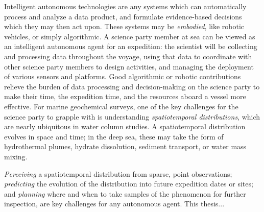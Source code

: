 Intelligent autonomous technologies are any systems which can automatically process and analyze a data product, and formulate evidence-based decisions which they may then act upon.
These systems may be \emph{embodied}, like robotic vehicles, or simply algorithmic.
A science party member at sea can be viewed as an intelligent autonomous agent for an expedition: the scientist will be collecting and processing data throughout the voyage, using that data to coordinate with other science party members to design activities, and managing the deployment of various sensors and platforms.
Good algorithmic or robotic contributions relieve the burden of data processing and decision-making on the science party to make their time, the expedition time, and the resources aboard a vessel more effective.
For marine geochemical surveys, one of the key challenges for the science party to grapple with is understanding \emph{spatiotemporal distributions}, which are nearly ubiquitous in water column studies.
A spatiotemporal distribution evolves in space and time; in the deep sea, these may take the form of hydrothermal plumes, hydrate dissolution, sediment transport, or water mass mixing.

\emph{Perceiving} a spatiotemporal distribution from sparse, point observations; \emph{predicting} the evolution of the distribution into future expedition dates or sites; and \emph{planning} where and when to take samples of the phenomenon for further inspection, are key challenges for any autonomous agent.
This thesis...










